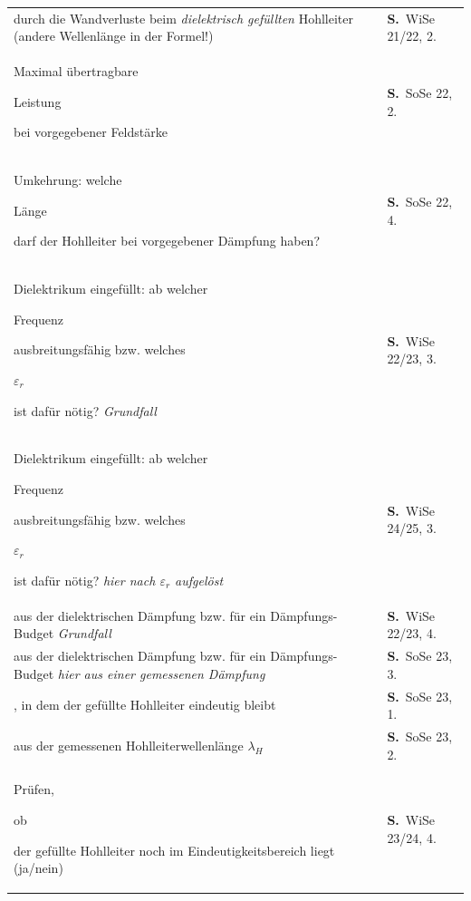 \documentclass[a4paper,10pt]{article}
\newcommand{\gs}[1]{{\setlength{\fboxsep}{0.5mm}%
  \colorbox{MarkerG!45}{\strut #1}}}
\begin{document}
\begin{tabularx}{\textwidth}{@{}>{\RaggedRight}X>{\RaggedRight\scriptsize}p{27mm}@{}}
\gs{Dämpfung in dB} durch die Wandverluste beim \emph{dielektrisch gefüllten} Hohlleiter (andere Wellenlänge in der Formel!) & \textbf{S.\,\pageref{tf:WiSe21x22:2:2}} \textcolor{Grau}{WiSe 21/22, 2.} \\
Maximal übertragbare \gs{Leistung} bei vorgegebener Feldstärke & \textbf{S.\,\pageref{tf:SoSe22:2:2}} \textcolor{Grau}{SoSe 22, 2.} \\
Umkehrung: welche \gs{Länge} darf der Hohlleiter bei vorgegebener Dämpfung haben? & \textbf{S.\,\pageref{tf:SoSe22:2:4}} \textcolor{Grau}{SoSe 22, 4.} \\
Dielektrikum eingefüllt: ab welcher \gs{Frequenz} ausbreitungsfähig bzw. welches \gs{$\varepsilon_r$} ist dafür nötig? \newline \hspace*{3mm}\textcolor{Grau}{\itshape \textendash{} Grundfall} & \textbf{S.\,\pageref{tf:WiSe22x23:2:3}} \textcolor{Grau}{WiSe 22/23, 3.} \\
Dielektrikum eingefüllt: ab welcher \gs{Frequenz} ausbreitungsfähig bzw. welches \gs{$\varepsilon_r$} ist dafür nötig? \newline \hspace*{3mm}\textcolor{Grau}{\itshape \textendash{} hier nach $\varepsilon_r$ aufgelöst} & \textbf{S.\,\pageref{tf:WiSe24y25:2:3}} \textcolor{Grau}{WiSe 24/25, 3.} \\
\gs{$\tan\delta$} aus der dielektrischen Dämpfung bzw. für ein Dämpfungs-Budget \newline \hspace*{3mm}\textcolor{Grau}{\itshape \textendash{} Grundfall} & \textbf{S.\,\pageref{tf:WiSe22x23:2:4}} \textcolor{Grau}{WiSe 22/23, 4.} \\
\gs{$\tan\delta$} aus der dielektrischen Dämpfung bzw. für ein Dämpfungs-Budget \newline \hspace*{3mm}\textcolor{Grau}{\itshape \textendash{} hier aus einer \emph{gemessenen} Dämpfung} & \textbf{S.\,\pageref{tf:SoSe23:2:3}} \textcolor{Grau}{SoSe 23, 3.} \\
\gs{$\varepsilon_r$-Bereich}, in dem der gefüllte Hohlleiter eindeutig bleibt & \textbf{S.\,\pageref{tf:SoSe23:2:1}} \textcolor{Grau}{SoSe 23, 1.} \\
\gs{$\varepsilon_r$} aus der gemessenen Hohlleiterwellenlänge $\lambda_H$ & \textbf{S.\,\pageref{tf:SoSe23:2:2}} \textcolor{Grau}{SoSe 23, 2.} \\
Prüfen, \gs{ob} der gefüllte Hohlleiter noch im Eindeutigkeitsbereich liegt (ja/nein) & \textbf{S.\,\pageref{tf:WiSe23x24:2:4}} \textcolor{Grau}{WiSe 23/24, 4.} \\

\end{tabularx}
\end{document}
